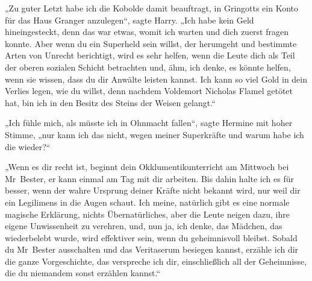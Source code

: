 „Zu guter Letzt habe ich die Kobolde damit beauftragt, in Gringotts ein Konto für das Haus Granger anzulegen“, sagte Harry. „Ich habe kein Geld hineingesteckt, denn das war etwas, womit ich warten und dich zuerst fragen konnte. Aber wenn du ein Superheld sein willst, der herumgeht und bestimmte Arten von Unrecht berichtigt, wird es sehr helfen, wenn die Leute dich als Teil der oberen sozialen Schicht betrachten und, ähm, ich denke, es könnte helfen, wenn sie wissen, dass du dir Anwälte leisten kannst. Ich kann so viel Gold in dein Verlies legen, wie du willst, denn nachdem Voldemort Nicholas Flamel getötet hat, bin ich in den Besitz des Steins der Weisen gelangt.“

„Ich fühle mich, als müsste ich in Ohnmacht fallen“, sagte Hermine mit hoher Stimme, „nur kann ich das nicht, wegen meiner Superkräfte und warum habe ich die wieder?“

„Wenn es dir recht ist, beginnt dein Okklumentikunterricht am Mittwoch bei Mr~Bester, er kann einmal am Tag mit dir arbeiten. Bis dahin halte ich es für besser, wenn der wahre Ursprung deiner Kräfte nicht bekannt wird, nur weil dir ein Legilimens in die Augen schaut. Ich meine, natürlich gibt es eine normale magische Erklärung, nichts Übernatürliches, aber die Leute neigen dazu, ihre eigene Unwissenheit zu verehren, und, nun ja, ich denke, das Mädchen, das wiederbelebt wurde, wird effektiver sein, wenn du geheimnisvoll bleibst. Sobald du Mr~Bester ausschalten und das Veritaserum besiegen kannst, erzähle ich dir die ganze Vorgeschichte, das verspreche ich dir, einschließlich all der Geheimnisse, die du niemandem sonst erzählen kannst.“

